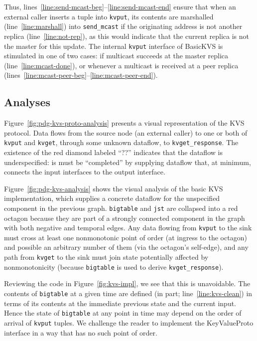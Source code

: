 Thus, lines~\ref{line:send-mcast-beg}--\ref{line:send-mcast-end} ensure that when an external caller inserts a tuple into
\texttt{kvput}, its contents are marshalled (line~\ref{line:marshall}) into \texttt{send\_mcast}
if the originating address is not another replica (line~\ref{line:not-rep}), as this would indicate
that the current replica is not the master for this update.  
The internal
\texttt{kvput} interface of BasicKVS is stimulated in one of two cases: if multicast succeeds
at the master replica (line~\ref{line:mcast-done}), or whenever a multicast is received at 
a peer replica (lines~\ref{line:mcast-peer-beg}--\ref{line:mcast-peer-end}).

\subsection{Analyses}
Figure~\ref{fig:pdg-kvs-proto-analysis} presents a visual representation of the KVS protocol.  Data
flows from the source node (an external caller) to one or both of \texttt{kvput} and 
\texttt{kvget}, through some unknown dataflow, to \texttt{kvget\_response}.
The existence of the red diamond labeled ``??'' indicates that the dataflow is underspecified:
is must be ``completed'' by supplying dataflow that, at minimum, connects the input 
interfaces to the output interface.

Figure~\ref{fig:pdg-kvs-analysis} shows the visual analysis of the basic KVS implementation,
which supplies a concrete dataflow for the unspecified component in the previous
graph.  \texttt{bigtable} and \texttt{jst} are collapsed into a red octagon because they
are part of a strongly connected component in the graph with both negative and temporal 
edges.  Any data flowing from \texttt{kvput} to the sink must cross at least one nonmonotonic
point of
order (at ingress to the octagon) and possible an arbitrary number of them (via the
octagon's self-edge), and any path from \texttt{kvget} to the sink must join state potentially
affected by nonmonotonicity (because \texttt{bigtable} is used to derive \texttt{kvget\_response}).

Reviewing the code in Figure~\ref{fig:kvs-impl}, we see that this is unavoidable.  The 
contents of \texttt{bigtable} at a given time are defined (in part; line~\ref{line:kvs-clean}) in terms
of its contents at the immediate previous state and the current input.  Hence the state
of \texttt{bigtable} at any point in time may depend on the order of arrival of \texttt{kvput} 
tuples.  We challenge the reader to implement the KeyValueProto interface in a way that
has no such point of order.

